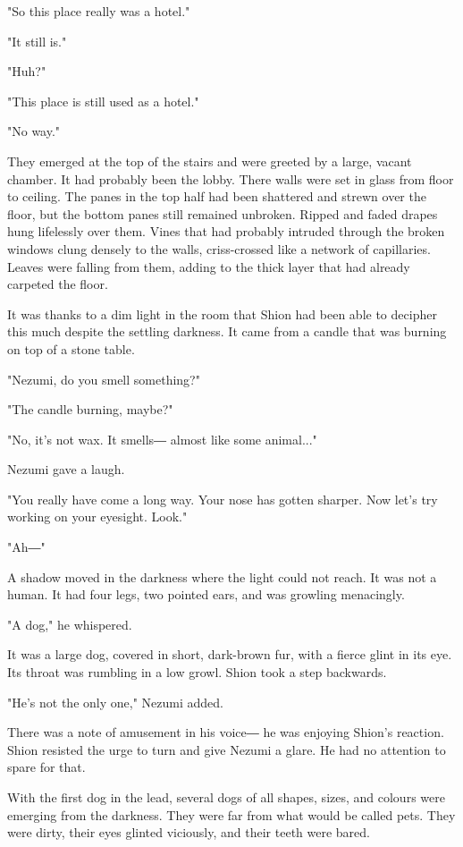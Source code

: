 "So this place really was a hotel."

"It still is."

"Huh?"

"This place is still used as a hotel."

"No way."

They emerged at the top of the stairs and were greeted by a large,
vacant chamber. It had probably been the lobby. There walls were set in
glass from floor to ceiling. The panes in the top half had been
shattered and strewn over the floor, but the bottom panes still remained
unbroken. Ripped and faded drapes hung lifelessly over them. Vines that
had probably intruded through the broken windows clung densely to the
walls, criss-crossed like a network of capillaries. Leaves were falling
from them, adding to the thick layer that had already carpeted the
floor.

It was thanks to a dim light in the room that Shion had been able to
decipher this much despite the settling darkness. It came from a candle
that was burning on top of a stone table.

"Nezumi, do you smell something?"

"The candle burning, maybe?"

"No, it's not wax. It smells― almost like some animal..."

Nezumi gave a laugh.

"You really have come a long way. Your nose has gotten sharper. Now
let's try working on your eyesight. Look."

"Ah―"

A shadow moved in the darkness where the light could not reach. It was
not a human. It had four legs, two pointed ears, and was growling
menacingly.

"A dog," he whispered.

It was a large dog, covered in short, dark-brown fur, with a fierce
glint in its eye. Its throat was rumbling in a low growl. Shion took a
step backwards.

"He's not the only one," Nezumi added.

There was a note of amusement in his voice― he was enjoying Shion's
reaction. Shion resisted the urge to turn and give Nezumi a glare. He
had no attention to spare for that.

With the first dog in the lead, several dogs of all shapes, sizes, and
colours were emerging from the darkness. They were far from what would
be called pets. They were dirty, their eyes glinted viciously, and their
teeth were bared.

